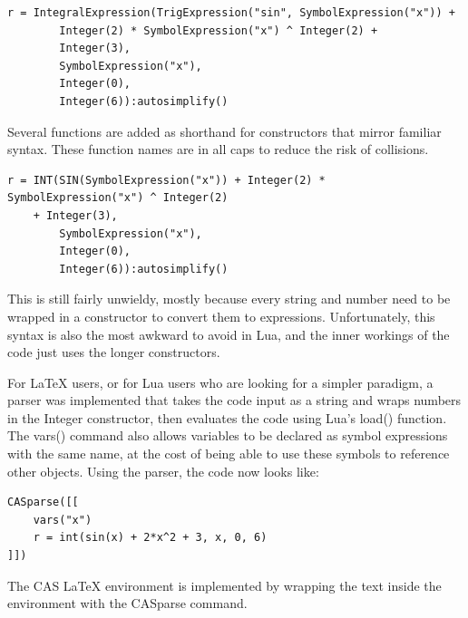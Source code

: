 \documentclass{article}
\begin{document}
\begin{verbatim}
r = IntegralExpression(TrigExpression("sin", SymbolExpression("x")) +
        Integer(2) * SymbolExpression("x") ^ Integer(2) +
        Integer(3),
        SymbolExpression("x"),
        Integer(0),
        Integer(6)):autosimplify()
\end{verbatim}

Several functions are added as shorthand for constructors that mirror familiar syntax. These function names are in all caps to reduce the risk of collisions.

\begin{verbatim}
r = INT(SIN(SymbolExpression("x")) + Integer(2) * SymbolExpression("x") ^ Integer(2) 
    + Integer(3),
        SymbolExpression("x"),
        Integer(0),
        Integer(6)):autosimplify()
\end{verbatim}

This is still fairly unwieldy, mostly because every string and number need to be wrapped in a constructor to convert them to expressions. Unfortunately, this syntax is also the most awkward to avoid in Lua, and the inner workings of the code just uses the longer constructors.

For \LaTeX{} users, or for Lua users who are looking for a simpler paradigm, a parser was implemented that takes the code input as a string and wraps numbers in the {\ttfamily Integer} constructor, then evaluates the code using Lua's {\ttfamily load()} function. The {\ttfamily vars()} command also allows variables to be declared as symbol expressions with the same name, at the cost of being able to use these symbols to reference other objects. Using the parser, the code now looks like:

\begin{verbatim}
CASparse([[
    vars("x")
    r = int(sin(x) + 2*x^2 + 3, x, 0, 6)
]])

\end{verbatim}

The CAS \LaTeX{} environment is implemented by wrapping the text inside the environment with the {\ttfamily CASparse} command.


\end{document}
